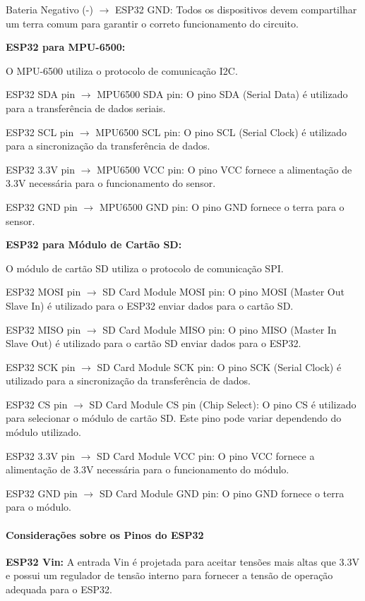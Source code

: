 Bateria Negativo (-) $\rightarrow$ ESP32 GND: Todos os dispositivos devem compartilhar um terra comum para garantir o correto funcionamento do circuito.

\textbf{ESP32 para MPU-6500:}

O MPU-6500 utiliza o protocolo de comunicação I2C.

ESP32 SDA pin $\rightarrow$ MPU6500 SDA pin: O pino SDA (Serial Data) é utilizado para a transferência de dados seriais.

ESP32 SCL pin $\rightarrow$ MPU6500 SCL pin: O pino SCL (Serial Clock) é utilizado para a sincronização da transferência de dados.

ESP32 3.3V pin $\rightarrow$ MPU6500 VCC pin: O pino VCC fornece a alimentação de 3.3V necessária para o funcionamento do sensor.

ESP32 GND pin $\rightarrow$ MPU6500 GND pin: O pino GND fornece o terra para o sensor.

\textbf{ESP32 para Módulo de Cartão SD:}

O módulo de cartão SD utiliza o protocolo de comunicação SPI.

ESP32 MOSI pin $\rightarrow$ SD Card Module MOSI pin: O pino MOSI (Master Out Slave In) é utilizado para o ESP32 enviar dados para o cartão SD.

ESP32 MISO pin $\rightarrow$ SD Card Module MISO pin: O pino MISO (Master In Slave Out) é utilizado para o cartão SD enviar dados para o ESP32.

ESP32 SCK pin $\rightarrow$ SD Card Module SCK pin: O pino SCK (Serial Clock) é utilizado para a sincronização da transferência de dados.

ESP32 CS pin $\rightarrow$ SD Card Module CS pin (Chip Select): O pino CS é utilizado para selecionar o módulo de cartão SD. Este pino pode variar dependendo do módulo utilizado.

ESP32 3.3V pin $\rightarrow$ SD Card Module VCC pin: O pino VCC fornece a alimentação de 3.3V necessária para o funcionamento do módulo.

ESP32 GND pin $\rightarrow$ SD Card Module GND pin: O pino GND fornece o terra para o módulo.

\paragraph{Considerações sobre os Pinos do ESP32}

\textbf{ESP32 Vin:} A entrada Vin é projetada para aceitar tensões mais altas que 3.3V e possui um regulador de tensão interno para fornecer a tensão de operação adequada para o ESP32.

